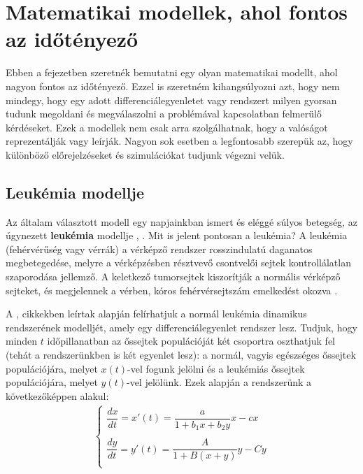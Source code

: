 \chapter{Matematikai modellek, ahol fontos az időtényező}

Ebben a fejezetben szeretnék bemutatni egy olyan matematikai modellt, ahol nagyon fontos az időtényező. Ezzel is szeretném kihangsúlyozni azt, hogy nem mindegy, hogy egy adott differenciálegyenletet vagy rendszert milyen gyorsan tudunk megoldani és megválaszolni a problémával kapcsolatban felmerülő kérdéseket. Ezek a modellek nem csak arra szolgálhatnak, hogy a valóságot reprezentálják vagy leírják. Nagyon sok esetben a legfontosabb szerepük az, hogy különböző előrejelzéseket és szimulációkat tudjunk végezni velük.

\section{Leukémia modellje}

Az általam választott modell egy napjainkban ismert és eléggé súlyos betegség, az úgynezett \textbf{leukémia} modellje \cite{LeukemiaModell2}, \cite{LeukemiaModell}. Mit is jelent pontosan a leukémia? A leukémia (fehérvérűség vagy vérrák) a vérképző rendszer rosszindulatú daganatos megbetegedése, melyre a vérképzésben résztvevő csontvelői sejtek kontrollálatlan szaporodása jellemző. A keletkező tumorsejtek kiszorítják a normális vérképző sejteket, és megjelennek a vérben, kóros fehérvérsejtszám emelkedést okozva \cite{LeukemiaMeghatarozas}.
\newline

A \cite{LeukemiaModell2}, \cite{LeukemiaModell} cikkekben leírtak alapján felírhatjuk a normál leukémia dinamikus rendszerének modelljét, amely egy differenciálegyenlet rendszer lesz. Tudjuk, hogy minden $ t $ időpillanatban az őssejtek populációját két csoportra oszthatjuk fel (tehát a rendszerünkben is két egyenlet lesz): a normál, vagyis egészséges őssejtek populációjára, melyet $ x(t) $-vel fogunk jelölni és a leukémiás őssejtek populációjára, melyet $ y(t) $-vel jelölünk. Ezek alapján a rendszerünk a következőképpen alakul:
\begin{align} \label{eq:leukemiaEgyenlet}
	\begin{cases}
		\dfrac{dx}{dt} = x'(t) = \dfrac{a}{1+b_{1}x+b_{2}y}x-cx \\ \\
		\dfrac{dy}{dt} = y'(t) = \dfrac{A}{1+B(x+y)}y-Cy \\
	\end{cases}
\end{align}

